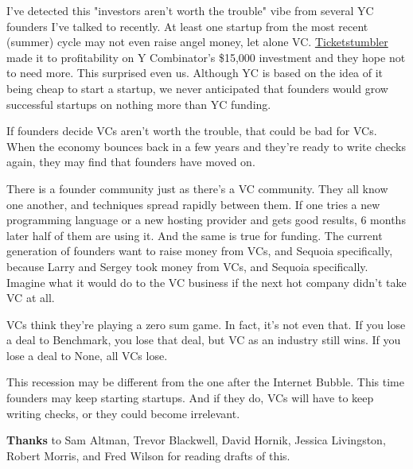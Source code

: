 I've detected this
                  "investors aren't worth the trouble" vibe from several YC
                  founders I've talked to recently. At least one startup from
                  the most recent (summer) cycle may not even raise angel money,
                  let alone VC.
                  \href{http://ticketstumbler.com}{Ticketstumbler} made it
                  to profitability on Y Combinator's \$15,000 investment and they
                  hope not to need more. This surprised even us. Although YC is
                  based on the idea of it being cheap to start a startup, we
                  never anticipated that founders would grow successful startups
                  on nothing more than YC funding.

If founders decide
                  VCs aren't worth the trouble, that could be bad for VCs. When
                  the economy bounces back in a few years and they're ready to
                  write checks again, they may find that founders have moved
                  on.

There is a founder community just as there's a
                  VC community. They all know one another, and techniques spread
                  rapidly between them. If one tries a new programming language
                  or a new hosting provider and gets good results, 6 months
                  later half of them are using it. And the same is true for
                  funding. The current generation of founders want to raise
                  money from VCs, and Sequoia specifically, because Larry and
                  Sergey took money from VCs, and Sequoia specifically. Imagine
                  what it would do to the VC business if the next hot company
                  didn't take VC at all.

VCs think they're playing a
                  zero sum game. In fact, it's not even that. If you lose a deal
                  to Benchmark, you lose that deal, but VC as an industry still
                  wins. If you lose a deal to None, all VCs lose.

This
                  recession may be different from the one after the Internet
                  Bubble. This time founders may keep starting startups. And if
                  they do, VCs will have to keep writing checks, or they could
                  become irrelevant.







\textbf{Thanks}
                  to Sam Altman, Trevor Blackwell, David Hornik, Jessica
                  Livingston, Robert Morris, and Fred Wilson for reading drafts
                  of this.


              
            
          
